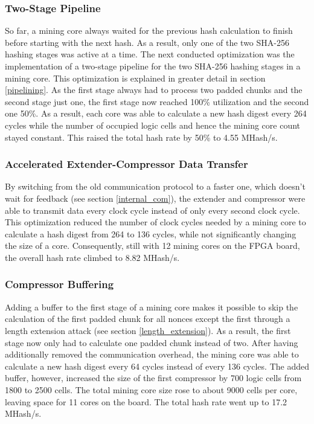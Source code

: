 \subsubsection*{Two-Stage Pipeline}
So far, a mining core always waited for the previous hash calculation to finish before starting with the next hash. As a result, only one of the two SHA-256 hashing stages was active at a time. The next conducted optimization was the implementation of a two-stage pipeline for the two SHA-256 hashing stages in a mining core. This optimization is explained in greater detail in section \ref{pipelining}. As the first stage always had to process two padded chunks and the second stage just one, the first stage now reached 100\% utilization and the second one 50\%. As a result, each core was able to calculate a new hash digest every 264 cycles while the number of occupied logic cells and hence the mining core count stayed constant. This raised the total hash rate by 50\% to 4.55 MHash/s.


\subsubsection*{Accelerated Extender-Compressor Data Transfer}
By switching from the old communication protocol to a faster one, which doesn't wait for feedback (see section \ref{internal_com}), the extender and compressor were able to transmit data every clock cycle instead of only every second clock cycle. This optimization reduced the number of clock cycles needed by a mining core to calculate a hash digest from 264 to 136 cycles, while not significantly changing the size of a core. Consequently, still with 12 mining cores on the FPGA board, the overall hash rate climbed to 8.82 MHash/s.

\subsubsection*{Compressor Buffering}
Adding a buffer to the first stage of a mining core makes it possible to skip the calculation of the first padded chunk for all nonces except the first through a length extension attack (see section \ref{length_extension}). As a result, the first stage now only had to calculate one padded chunk instead of two. After having additionally removed the communication overhead, the mining core was able to calculate a new hash digest every 64 cycles instead of every 136 cycles. The added buffer, however, increased the size of the first compressor by 700 logic cells from 1800 to 2500 cells. The total mining core size rose to about 9000 cells per core, leaving space for 11 cores on the board. The total hash rate went up to 17.2 MHash/s.

